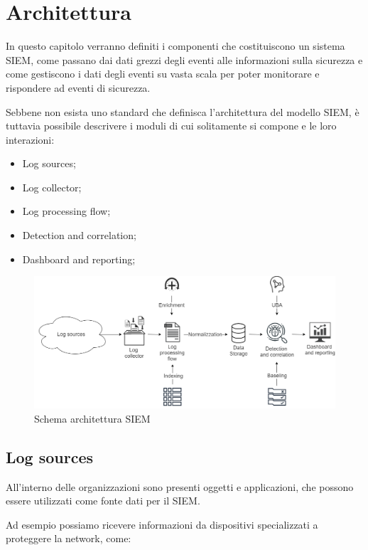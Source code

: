 \chapter{Architettura}
\label{chap:Architettura}

In questo capitolo verranno definiti i componenti che costituiscono un sistema SIEM, come passano dai dati grezzi degli eventi alle informazioni sulla sicurezza e come gestiscono i dati degli eventi su vasta scala per poter monitorare e rispondere ad eventi di sicurezza.\par
Sebbene non esista uno standard che definisca l’architettura del modello SIEM, è tuttavia possibile descrivere i moduli di cui solitamente si compone e le loro interazioni:


\begin{itemize}
    \item{Log sources}; 
    \item{Log collector};
    \item{Log processing flow};
    \item{Detection and correlation};
    \item{Dashboard and reporting};
\end{itemize}

\begin{figure}[h]
\begin{center}
\includegraphics[width=0.80\columnwidth]{images/2_architettura_img/architettura_SIEM.png}
\end{center}
\caption{Schema architettura SIEM}
\label{fig:Schema architettura SIEM}
\end{figure}



\section{Log sources}
\label{sec: 2.1 Log sources}

All’interno delle organizzazioni sono presenti oggetti e applicazioni, che possono essere utilizzati come fonte dati per il SIEM.\par
Ad esempio possiamo ricevere informazioni da dispositivi specializzati a proteggere la network, come: 

